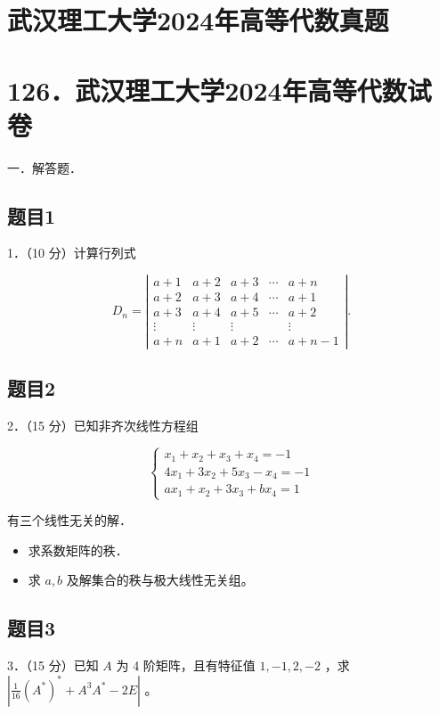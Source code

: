 \documentclass{article}
\begin{document}
\section*{武汉理工大学2024年高等代数真题}
\section*{126．武汉理工大学2024年高等代数试卷}
一．解答题．\\

\subsection{题目1}
1．（10 分）计算行列式

\[
D_{n}=\left|\begin{array}{ccccc}
a+1 & a+2 & a+3 & \cdots & a+n \\
a+2 & a+3 & a+4 & \cdots & a+1 \\
a+3 & a+4 & a+5 & \cdots & a+2 \\
\vdots & \vdots & \vdots & & \vdots \\
a+n & a+1 & a+2 & \cdots & a+n-1
\end{array}\right| .
\]

\subsection{题目2}
2．（15 分）已知非齐次线性方程组

\[
\left\{\begin{array}{l}
x_{1}+x_{2}+x_{3}+x_{4}=-1 \\
4 x_{1}+3 x_{2}+5 x_{3}-x_{4}=-1 \\
a x_{1}+x_{2}+3 x_{3}+b x_{4}=1
\end{array}\right.
\]

有三个线性无关的解．

\begin{itemize}
  \item[（1）] 求系数矩阵的秩．
  \item[（2）] 求 \(a, b\) 及解集合的秩与极大线性无关组。
\end{itemize}

\subsection{题目3}
3．（15 分）已知 \(A\) 为 4 阶矩阵，且有特征值 \(1,-1,2,-2\) ，求 \(\left|\frac{1}{16}\left(A^{*}\right)^{*}+A^{3} A^{*}-2 E\right|\) 。
\end{document}
